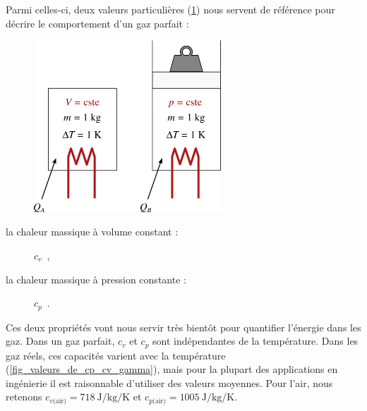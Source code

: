 		Parmi celles-ci, deux valeurs particulières (\cref{fig_cp_et_cv}) nous servent de référence pour décrire le comportement d’un gaz parfait :

		\begin{figure}
			\begin{center}
				\includegraphics[width=7cm]{images/capacites_calorifiques.png}
			\end{center}
			\label{fig_cp_et_cv}
		\end{figure}
		
		\begin{description}
			\item[la chaleur massique à volume constant :]$c_v$~, \dontbreakpage
			\item[la chaleur massique à pression constante :]$c_p$~.
		\end{description}

		Ces deux propriétés vont nous servir très bientôt pour quantifier l’énergie dans les gaz. Dans un gaz parfait, $c_v$ et $c_p$ sont indépendantes de la température. Dans les gaz réels, ces capacités varient avec la température (\cref{fig_valeurs_de_cp_cv_gamma}), mais pour la plupart des applications en ingénierie il est raisonnable d’utiliser des valeurs moyennes. Pour l’air, nous retenons $c_{v\text{(air)}} = \SI{718}{\joule\per\kilogram\per\kelvin}$ et $c_{p\text{(air)}} = \SI{1005}{\joule\per\kilogram\per\kelvin}$.

